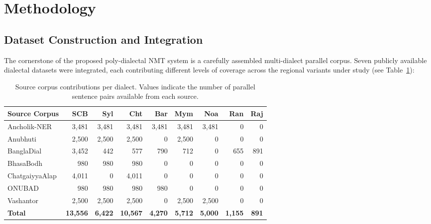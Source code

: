 \documentclass[12pt,a4paper]{article}
\begin{document}
\newpage

\section{Methodology}

\subsection{Dataset Construction and Integration}
The cornerstone of the proposed poly-dialectal NMT system is a carefully assembled multi-dialect parallel corpus. Seven publicly available dialectal datasets were integrated, each contributing different levels of coverage across the regional variants under study (see Table~\ref{tab:source_contributions}):

\begin{table}[htbp]
\centering
\caption{Source corpus contributions per dialect. Values indicate the number of parallel sentence pairs available from each source.}
\label{tab:source_contributions}
\small
\begin{tabular}{l r r r r r r r r}
\toprule
\textbf{Source Corpus} & \textbf{SCB} & \textbf{Syl} & \textbf{Cht} & \textbf{Bar} & \textbf{Mym} & \textbf{Noa} & \textbf{Ran} & \textbf{Raj} \\
\midrule
Ancholik-NER   & 3,481 & 3,481 & 3,481 & 3,481 & 3,481 & 3,481 & 0     & 0 \\
Anubhuti        & 2,500 & 2,500 & 2,500 & 0     & 2,500 & 0     & 0     & 0 \\
BanglaDial      & 3,452 & 442   & 577   & 790   & 712   & 0     & 655   & 891 \\
BhasaBodh       & 980   & 980   & 980   & 0     & 0     & 0     & 0     & 0 \\
ChatgaiyyaAlap  & 4,011 & 0     & 4,011 & 0     & 0     & 0     & 0     & 0 \\
ONUBAD          & 980   & 980   & 980   & 980   & 0     & 0     & 0     & 0 \\
Vashantor       & 2,500 & 2,500 & 2,500 & 0     & 2,500 & 2,500 & 0     & 0 \\
\midrule
\textbf{Total}  & \textbf{13,556} & \textbf{6,422} & \textbf{10,567} & \textbf{4,270} & \textbf{5,712} & \textbf{5,000} & \textbf{1,155} & \textbf{891} \\
\bottomrule
\end{tabular}
\end{table}
\end{document}
